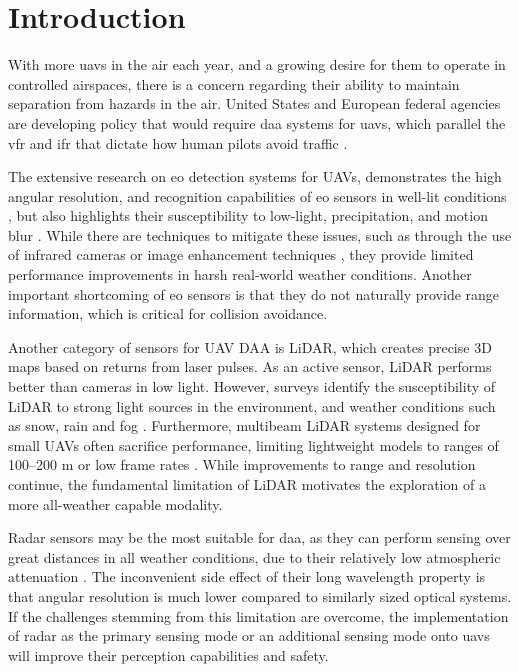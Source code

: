 \chapter{Introduction}
With more \gls{uav}s in the air each year, and a growing desire 
for them to operate in controlled airspaces, there is a concern regarding their ability 
to maintain separation from hazards in the air. United States and European federal 
agencies are developing policy that would require \gls{daa} systems for
\gls{uav}s, which parallel the \gls{vfr} and \gls{ifr} that dictate
how human pilots avoid traffic \cite{easa_easy_access_uas_2024} \cite{rtca_sc228_2025} 
\cite{serres_wu_2021_nasa_tm}.

The extensive research on \gls{eo} detection systems for UAVs, 
demonstrates the high angular resolution, and recognition capabilities 
of \gls{eo} sensors in well-lit conditions \cite{rs16050756}, but also highlights 
their susceptibility to low-light, 
precipitation, and motion blur \cite{drones8110638}. While there are 
techniques to mitigate these issues, such as through the use of infrared 
cameras or  
image enhancement techniques \cite{aerospace9120829}, they provide limited 
performance improvements in harsh real-world weather conditions. Another
important shortcoming of \gls{eo} sensors is that they do not naturally provide
range information, which is critical for collision avoidance.

Another category of sensors for UAV DAA is LiDAR, which creates precise 
3D maps based on returns from laser pulses. As an active sensor, LiDAR 
performs better than cameras in low light. However, surveys   
identify the susceptibility of LiDAR to strong light sources in the 
environment, and weather conditions such as snow, rain and fog \cite{ZHANG2023146}.
Furthermore, multibeam LiDAR systems designed for small UAVs often sacrifice 
performance, limiting lightweight models to ranges of 100--200 m 
or low frame rates \cite{benewake_tfa1200}  
\cite{sysak2025_lightweight_compact_pulse_radar_uav_collision_avoidance}. 
While improvements to range and resolution continue, the fundamental 
limitation of LiDAR motivates the exploration of a more all-weather capable
modality. 

Radar sensors may be the most suitable for \gls{daa}, as they can perform 
sensing over great distances in all weather conditions, due to their relatively low 
atmospheric attenuation \cite{borden_radar_imaging_airborne_targets_1999}. The 
inconvenient side effect of their long wavelength property is that angular resolution 
is much lower compared to similarly sized optical systems. If the challenges stemming 
from this limitation are overcome, the implementation of radar as the primary sensing 
mode or an additional sensing mode onto \gls{uav}s will improve their perception capabilities 
and safety.

